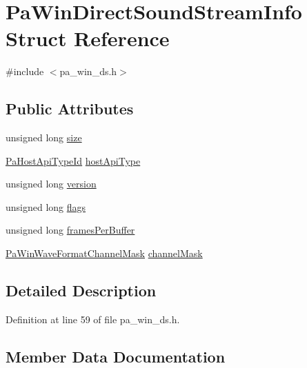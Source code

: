\hypertarget{struct_pa_win_direct_sound_stream_info}{}\section{Pa\+Win\+Direct\+Sound\+Stream\+Info Struct Reference}
\label{struct_pa_win_direct_sound_stream_info}


{\ttfamily \#include $<$pa\+\_\+win\+\_\+ds.\+h$>$}

\subsection*{Public Attributes}
\begin{DoxyCompactItemize}
\item 
unsigned long \hyperlink{struct_pa_win_direct_sound_stream_info_a628ca7f8b755a42182a76f9e88202ea0}{size}
\item 
\hyperlink{portaudio_8h_a8eaebe3d39c5ea45598da8f86dc2e5ae}{Pa\+Host\+Api\+Type\+Id} \hyperlink{struct_pa_win_direct_sound_stream_info_a86baa9ebeb0f10ca2f4fe24c41cd3bea}{host\+Api\+Type}
\item 
unsigned long \hyperlink{struct_pa_win_direct_sound_stream_info_a9baec8b75c5b93b59217625b790bebbe}{version}
\item 
unsigned long \hyperlink{struct_pa_win_direct_sound_stream_info_a72f9dcac1303ba51fd1e36965a7cda46}{flags}
\item 
unsigned long \hyperlink{struct_pa_win_direct_sound_stream_info_adb9fc9098994e07ac7e1e7e9ac2175d7}{frames\+Per\+Buffer}
\item 
\hyperlink{pa__win__waveformat_8h_ad7a5a909f82e3f45d4c690d09d53a3f4}{Pa\+Win\+Wave\+Format\+Channel\+Mask} \hyperlink{struct_pa_win_direct_sound_stream_info_aa9282b945c2331e1dd3f13b64fa7e927}{channel\+Mask}
\end{DoxyCompactItemize}


\subsection{Detailed Description}


Definition at line 59 of file pa\+\_\+win\+\_\+ds.\+h.



\subsection{Member Data Documentation}
